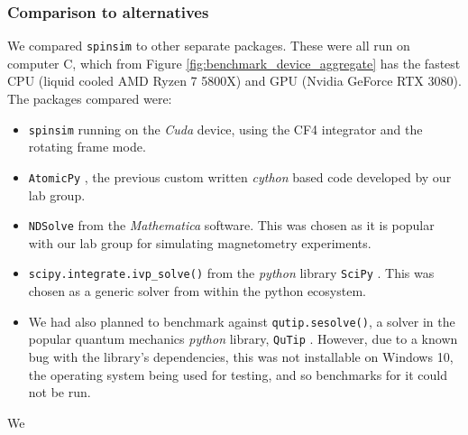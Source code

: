 \documentclass{jors}
\begin{document}
		\subsubsection*{Comparison to alternatives}
			We compared \texttt{spinsim} to other separate packages. These were all run on computer C, which from Figure \ref{fig:benchmark_device_aggregate} has the fastest CPU (liquid cooled AMD Ryzen 7 5800X) and GPU (Nvidia GeForce RTX 3080). The packages compared were:
			\begin{itemize}
				\item \texttt{spinsim} running on the \emph{Cuda} device, using the CF4 integrator and the rotating frame mode.
				\item \texttt{AtomicPy} \cite{morris_qcmonkatomicpy_2018}, the previous custom written \emph{cython} based code developed by our lab group.
				\item \texttt{NDSolve} from the \emph{Mathematica} \cite{wolfram_research_inc_mathematica_2020} software. This was chosen as it is popular with our lab group for simulating magnetometry experiments.
				\item \texttt{scipy.integrate.ivp\_solve()} from the \emph{python} library \texttt{SciPy} \cite{virtanen_scipy_2020}. This was chosen as a generic solver from within the python ecosystem.
				\item We had also planned to benchmark against \texttt{qutip.sesolve()}, a solver in the popular quantum mechanics \emph{python} library, \texttt{QuTip} \cite{johansson_qutip_2013}. However, due to a known bug with the library’s dependencies, this was not installable on Windows 10, the operating system being used for testing, and so benchmarks for it could not be run.
			\end{itemize}

			We 

\end{document}
